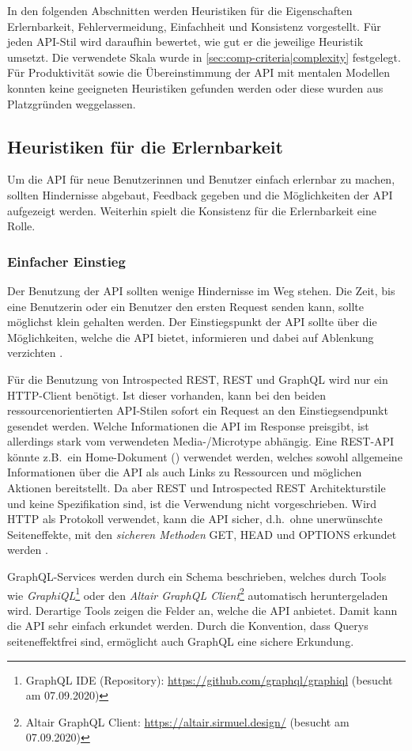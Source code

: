 In den folgenden Abschnitten werden Heuristiken für die Eigenschaften Erlernbarkeit, Fehlervermeidung, Einfachheit und Konsistenz vorgestellt. Für jeden API-Stil wird daraufhin bewertet, wie gut er die jeweilige Heuristik umsetzt. Die verwendete Skala wurde in \cref{sec:comp-criteria|complexity} festgelegt. Für Produktivität sowie die Übereinstimmung der API mit mentalen Modellen konnten keine geeigneten Heuristiken gefunden werden oder diese wurden aus Platzgründen weggelassen.

\subsection{Heuristiken für die Erlernbarkeit}
Um die API für neue Benutzerinnen und Benutzer einfach erlernbar zu machen, sollten Hindernisse abgebaut, Feedback gegeben und die Möglichkeiten der API aufgezeigt werden. Weiterhin spielt die Konsistenz für die Erlernbarkeit eine Rolle.

\subsubsection{Einfacher Einstieg}
Der Benutzung der API sollten wenige Hindernisse im Weg stehen. Die Zeit, bis eine Benutzerin oder ein Benutzer den ersten Request senden kann, sollte möglichst klein gehalten werden. Der Einstiegspunkt der API sollte über die Möglichkeiten, welche die API bietet, informieren und dabei auf Ablenkung verzichten \autocite[S.~80]{Lidwell2010}.

\para{}Für die Benutzung von Introspected REST, REST und GraphQL wird nur ein HTTP-Client benötigt. Ist dieser vorhanden, kann bei den beiden ressourcenorientierten API-Stilen sofort ein Request an den Einstiegsendpunkt gesendet werden. Welche Informationen die API im Response preisgibt, ist allerdings stark vom verwendeten Media-/Microtype abhängig. Eine REST-API könnte z.B.\ ein Home-Dokument (\autocite{Nottingham2017}) verwendet werden, welches sowohl allgemeine Informationen über die API als auch Links zu Ressourcen und möglichen Aktionen bereitstellt. Da aber REST und Introspected REST Architekturstile und keine Spezifikation sind, ist die Verwendung nicht vorgeschrieben. Wird HTTP als Protokoll verwendet, kann die API sicher, d.h.\ ohne unerwünschte Seiteneffekte, mit den \emph{sicheren Methoden} GET, HEAD und OPTIONS erkundet werden \autocite[Abs.~4.2.1]{RFC7231}.

GraphQL-Services werden durch ein Schema beschrieben, welches durch Tools wie \textit{GraphiQL}\footnote{GraphQL IDE (Repository): \url{https://github.com/graphql/graphiql} (besucht am 07.09.2020)} oder den \textit{Altair GraphQL Client}\footnote{Altair GraphQL Client: \url{https://altair.sirmuel.design/} (besucht am 07.09.2020)} automatisch heruntergeladen wird. Derartige Tools zeigen die Felder an, welche die API anbietet. Damit kann die API sehr einfach erkundet werden. Durch die Konvention, dass Querys seiteneffektfrei sind, ermöglicht auch GraphQL eine sichere Erkundung.

